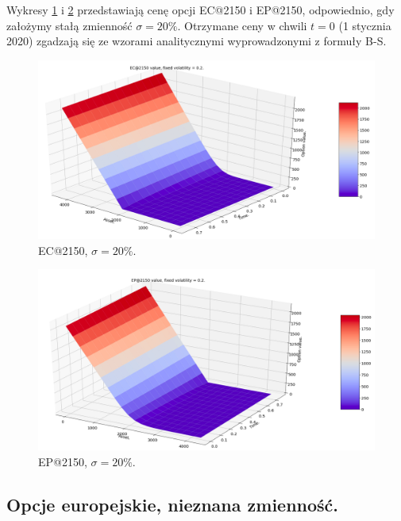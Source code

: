 \documentclass[12pt]{article}
\begin{document}
Wykresy \ref{fig:ec_2150_fixed_vol} i \ref{fig:ep_2150_fixed_vol} przedstawiają cenę opcji EC@2150  i EP@2150, odpowiednio, gdy założymy stałą zmienność $\sigma = 20\%.$ Otrzymane ceny w chwili $t=0$  (1 stycznia 2020) zgadzają się ze wzorami analitycznymi wyprowadzonymi z formuły B-S.
\begin{figure}[H]
    \centering
    \includegraphics[width=\textwidth,height=\textheight,keepaspectratio]{ec_2150_fixed_vol.png.png}
    \caption{EC@2150, $\sigma = 20\%.$}
    \label{fig:ec_2150_fixed_vol}
\end{figure}

\begin{figure}[H]
    \centering
    \includegraphics[width=\textwidth,height=\textheight,keepaspectratio]{ep_2150_fixed_vol.png}
    \caption{EP@2150, $\sigma = 20\%.$}
    \label{fig:ep_2150_fixed_vol}
\end{figure}

\newpage

\subsection{Opcje europejskie, nieznana zmienność.}
\end{document}
